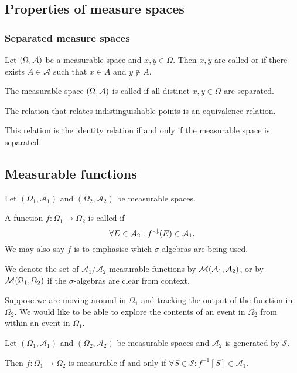\subsection{Properties of measure spaces}
\subsubsection{Separated measure spaces}
\begin{definition}
Let $\sSet{\Omega,\mathcal{A}}$ be a measurable space and $x,y\in \Omega$. Then $x,y$ are called  or  if there exists $A\in \mathcal{A}$ such that $x\in A$ and $y\notin A$.

The measurable space $\sSet{\Omega,\mathcal{A}}$ is called  if all distinct $x,y\in \Omega$ are separated.
\end{definition}

\begin{lemma}
The relation that relates indistinguishable points is an equivalence relation.

This relation is the identity relation \textup{if and only if} the measurable space is separated.
\end{lemma}

\subsection{Measurable functions}
\begin{definition}
Let $(\Omega_1, \mathcal{A}_1)$ and $(\Omega_2, \mathcal{A}_2)$ be measurable spaces.

A function $f:\Omega_1 \to \Omega_2$ is called  if
\[ \forall E\in\mathcal{A}_2: f^{{\text{\hspace{0.15em}-}\downarrow}}(E) \in\mathcal{A}_1. \]
We may also say $f$ is  to emphasise which $\sigma$-algebras are being used.

We denote the set of $\mathcal{A}_1/\mathcal{A}_2$-measurable functions by $\operatorname{\mathcal{M}}(\mathcal{A}_1, \mathcal{A}_2)$, or by $\operatorname{\mathcal{M}}(\Omega_1, \Omega_2)$ if the $\sigma$-algebras are clear from context.
\end{definition}
Suppose we are moving around in $\Omega_1$ and tracking the output of the function in $\Omega_2$. We would like to be able to explore the contents of an event in $\Omega_2$ from within an event in $\Omega_1$.

\begin{lemma} \label{measurableFromGeneratingSet}
Let $(\Omega_1, \mathcal{A}_1)$ and $(\Omega_2, \mathcal{A}_2)$ be measurable spaces and $\mathcal{A}_2$ is generated by $\mathcal{S}$.

Then $f: \Omega_1\to \Omega_2$ is measurable \textup{if and only if} $\forall S\in\mathcal{S}: f^{-1}[S] \in \mathcal{A}_1$.
\end{lemma}


